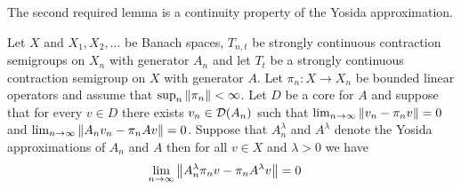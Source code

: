 The second required lemma is a continuity property of the Yosida approximation.
\begin{lem}\label{SCCSYosidaContinuity}Let $X$ and $X_1, X_2, \dotsc$ be Banach spaces, $T_{n,t}$ be strongly continuous contraction semigroups on $X_n$ with generator $A_n$ and let $T_t$ be a strongly continuous contraction semigroup on $X$ with generator $A$.  Let $\pi_n : X \to X_n$ be bounded linear operators and assume that $\sup_{n} \left \lVert \pi_n \right \rVert < \infty$.  Let $D$ be a
core for $A$ and suppose that for every $v \in D$ there exists $v_n \in \mathcal{D}(A_n)$ such that $\lim_{n \to \infty} \left \lVert v_n - \pi_n v \right \rVert = 0$ and $\lim_{n \to \infty} \left \lVert A_n v_n - \pi_n A v \right \rVert = 0$.  Suppose that $A^\lambda_n$ and $A^\lambda$ denote the Yosida approximations of $A_n$ and $A$ then for all $v \in X$ and $\lambda > 0$ we have
\begin{align*}
\lim_{n \to \infty} \left \lVert A^\lambda_n \pi_n v - \pi_n A^\lambda v \right \rVert &= 0
\end{align*}
\end{lem}
